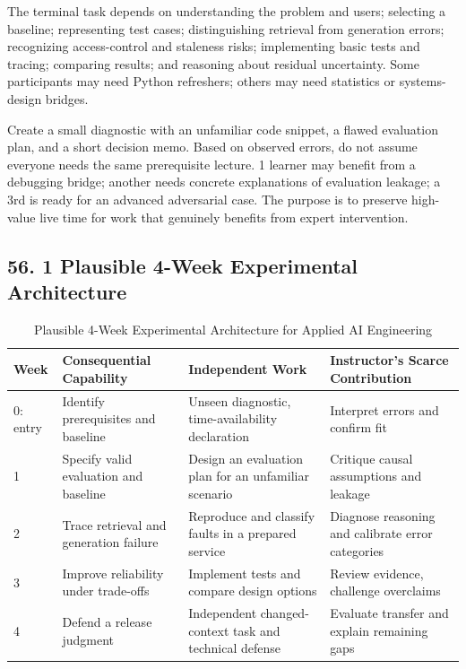 The terminal task depends on understanding the problem and users; selecting a baseline; representing test cases; distinguishing retrieval from generation errors; recognizing access-control and staleness risks; implementing basic tests and tracing; comparing results; and reasoning about residual uncertainty. Some participants may need Python refreshers; others may need statistics or systems-design bridges.

Create a small diagnostic with an unfamiliar code snippet, a flawed evaluation plan, and a short decision memo. Based on observed errors, do not assume everyone needs the same prerequisite lecture. 1 learner may benefit from a debugging bridge; another needs concrete explanations of evaluation leakage; a 3rd is ready for an advanced adversarial case. The purpose is to preserve high-value live time for work that genuinely benefits from expert intervention.

\subsection*{56. 1 Plausible 4-Week Experimental Architecture}

\begin{table}[t]
\centering
\small
\caption{Plausible 4-Week Experimental Architecture for Applied AI Engineering}
\begin{tabularx}{\textwidth}{p{}p{}p{}X}
\toprule
\textbf{Week} & \textbf{Consequential Capability} & \textbf{Independent Work} & \textbf{Instructor's Scarce Contribution} \\
\midrule
0: entry & Identify prerequisites and baseline & Unseen diagnostic, time-availability declaration & Interpret errors and confirm fit \\
1 & Specify valid evaluation and baseline & Design an evaluation plan for an unfamiliar scenario & Critique causal assumptions and leakage \\
2 & Trace retrieval and generation failure & Reproduce and classify faults in a prepared service & Diagnose reasoning and calibrate error categories \\
3 & Improve reliability under trade-offs & Implement tests and compare design options & Review evidence, challenge overclaims \\
4 & Defend a release judgment & Independent changed-context task and technical defense & Evaluate transfer and explain remaining gaps \\
\bottomrule
\end{tabularx}
\end{table}

